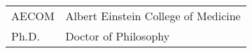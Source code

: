 \begin{abbreviations}

\begin{longtable}{ p{} p{} }
AECOM & Albert Einstein College of Medicine\\
Ph.D. & Doctor of Philosophy\\
\end{longtable}

\end{abbreviations}